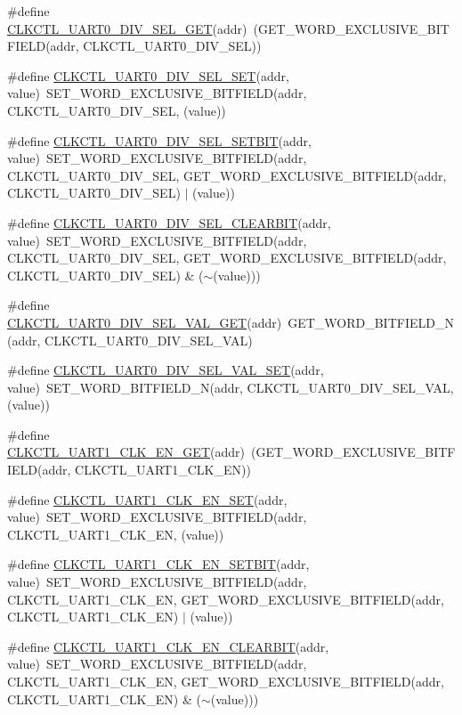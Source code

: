 \begin{DoxyCompactItemize}
\item 
\#define \hyperlink{a00544_a76a2e66ace0bf92f4ae5ddc2510cc275}{CLKCTL\_\-UART0\_\-DIV\_\-SEL\_\-GET}(addr)~(GET\_\-WORD\_\-EXCLUSIVE\_\-BITFIELD(addr, CLKCTL\_\-UART0\_\-DIV\_\-SEL))
\item 
\#define \hyperlink{a00544_ab8ec57b59b4df734ef2d18ce706e322f}{CLKCTL\_\-UART0\_\-DIV\_\-SEL\_\-SET}(addr, value)~SET\_\-WORD\_\-EXCLUSIVE\_\-BITFIELD(addr, CLKCTL\_\-UART0\_\-DIV\_\-SEL, (value))
\item 
\#define \hyperlink{a00544_a11e26c58911499de701f6ce0b4fd3031}{CLKCTL\_\-UART0\_\-DIV\_\-SEL\_\-SETBIT}(addr, value)~SET\_\-WORD\_\-EXCLUSIVE\_\-BITFIELD(addr, CLKCTL\_\-UART0\_\-DIV\_\-SEL, GET\_\-WORD\_\-EXCLUSIVE\_\-BITFIELD(addr, CLKCTL\_\-UART0\_\-DIV\_\-SEL) $|$ (value))
\item 
\#define \hyperlink{a00544_a60bf139d391f380c979fd7460c59a582}{CLKCTL\_\-UART0\_\-DIV\_\-SEL\_\-CLEARBIT}(addr, value)~SET\_\-WORD\_\-EXCLUSIVE\_\-BITFIELD(addr, CLKCTL\_\-UART0\_\-DIV\_\-SEL, GET\_\-WORD\_\-EXCLUSIVE\_\-BITFIELD(addr, CLKCTL\_\-UART0\_\-DIV\_\-SEL) \& ($\sim$(value)))
\item 
\#define \hyperlink{a00544_aa4aff89fa50faade34604c5e3200493a}{CLKCTL\_\-UART0\_\-DIV\_\-SEL\_\-VAL\_\-GET}(addr)~GET\_\-WORD\_\-BITFIELD\_\-N(addr, CLKCTL\_\-UART0\_\-DIV\_\-SEL\_\-VAL)
\item 
\#define \hyperlink{a00544_a18c81d2800aee5c83573aece95a1d965}{CLKCTL\_\-UART0\_\-DIV\_\-SEL\_\-VAL\_\-SET}(addr, value)~SET\_\-WORD\_\-BITFIELD\_\-N(addr, CLKCTL\_\-UART0\_\-DIV\_\-SEL\_\-VAL, (value))
\item 
\#define \hyperlink{a00544_a35502b108de79eb36a1994a70cbe2be4}{CLKCTL\_\-UART1\_\-CLK\_\-EN\_\-GET}(addr)~(GET\_\-WORD\_\-EXCLUSIVE\_\-BITFIELD(addr, CLKCTL\_\-UART1\_\-CLK\_\-EN))
\item 
\#define \hyperlink{a00544_ae8908ad1160b32f330fea963475a2a1b}{CLKCTL\_\-UART1\_\-CLK\_\-EN\_\-SET}(addr, value)~SET\_\-WORD\_\-EXCLUSIVE\_\-BITFIELD(addr, CLKCTL\_\-UART1\_\-CLK\_\-EN, (value))
\item 
\#define \hyperlink{a00544_a979b187ed39506d90d7a86c564403550}{CLKCTL\_\-UART1\_\-CLK\_\-EN\_\-SETBIT}(addr, value)~SET\_\-WORD\_\-EXCLUSIVE\_\-BITFIELD(addr, CLKCTL\_\-UART1\_\-CLK\_\-EN, GET\_\-WORD\_\-EXCLUSIVE\_\-BITFIELD(addr, CLKCTL\_\-UART1\_\-CLK\_\-EN) $|$ (value))
\item 
\#define \hyperlink{a00544_a1da91f8bb429c171c00af373a4404661}{CLKCTL\_\-UART1\_\-CLK\_\-EN\_\-CLEARBIT}(addr, value)~SET\_\-WORD\_\-EXCLUSIVE\_\-BITFIELD(addr, CLKCTL\_\-UART1\_\-CLK\_\-EN, GET\_\-WORD\_\-EXCLUSIVE\_\-BITFIELD(addr, CLKCTL\_\-UART1\_\-CLK\_\-EN) \& ($\sim$(value)))

\end{DoxyCompactItemize}
